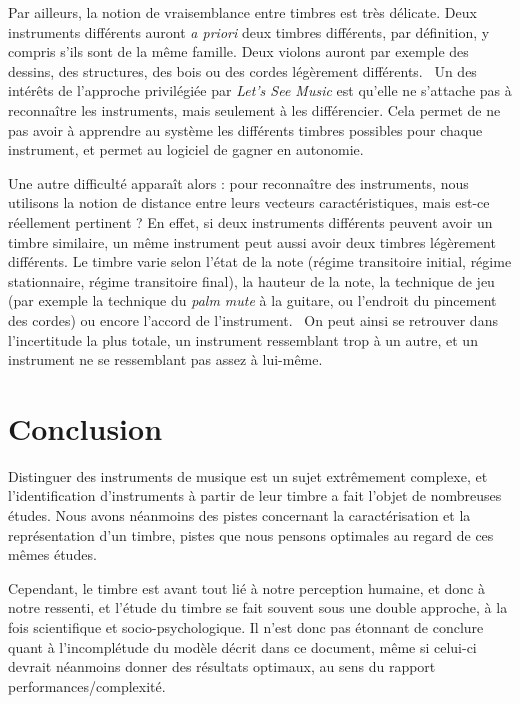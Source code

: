 \documentclass[10pt]{article}
\begin{document}
\begin{multicols}{2}
Par ailleurs, la notion de vraisemblance entre timbres est très délicate.
Deux instruments différents auront \emph{a priori} deux timbres différents, par définition, y compris s'ils sont de la même famille.
Deux violons auront par exemple des dessins, des structures, des bois ou des cordes légèrement différents.~\cite{Séry}
Un des intérêts de l'approche privilégiée par \emph{Let's See Music} est qu'elle ne s'attache pas à reconnaître les instruments, mais seulement à les différencier.
Cela permet de ne pas avoir à apprendre au système les différents timbres possibles pour chaque instrument, et permet au logiciel de gagner en autonomie.

Une autre difficulté apparaît alors : pour reconnaître des instruments, nous utilisons la notion de distance entre leurs vecteurs caractéristiques, mais est-ce réellement pertinent ?
En effet, si deux instruments différents peuvent avoir un timbre similaire, un même instrument peut aussi avoir deux timbres légèrement différents.
Le timbre varie selon l'état de la note (régime transitoire initial, régime stationnaire, régime transitoire final), la hauteur de la note, la technique de jeu (par exemple la technique du \emph{palm mute} à la guitare, ou l'endroit du pincement des cordes) ou encore l'accord de l'instrument.~\cite{Séry}
On peut ainsi se retrouver dans l'incertitude la plus totale, un instrument ressemblant trop à un autre, et un instrument ne se ressemblant pas assez à lui-même.






\label{Conclusion}
\section{Conclusion}

Distinguer des instruments de musique est un sujet extrêmement complexe, et l'identification d'instruments à partir de leur timbre a fait l'objet de nombreuses études.
Nous avons néanmoins des pistes concernant la caractérisation et la représentation d'un timbre, pistes que nous pensons optimales au regard de ces mêmes études.

Cependant, le timbre est avant tout lié à notre perception humaine, et donc à notre ressenti, et l'étude du timbre se fait souvent sous une double approche, à la fois scientifique et socio-psychologique.
Il n'est donc pas étonnant de conclure quant à l'incomplétude du modèle décrit dans ce document, même si celui-ci devrait néanmoins donner des résultats optimaux, au sens du rapport performances/complexité.


\end{multicols}
\end{document}

